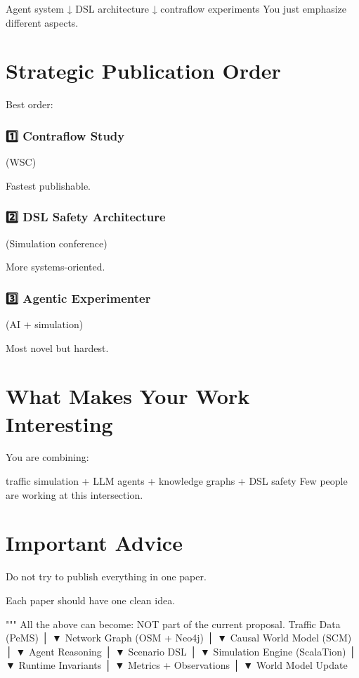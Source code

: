 Agent system
↓
DSL architecture
↓
contraflow experiments
You just emphasize different aspects.

\chapter*{Strategic Publication Order}
Best order:

\subsection*{1️⃣ Contraflow Study}
(WSC)

Fastest publishable.

\subsection*{2️⃣ DSL Safety Architecture}
(Simulation conference)

More systems-oriented.

\subsection*{3️⃣ Agentic Experimenter}
(AI + simulation)

Most novel but hardest.

\chapter*{What Makes Your Work Interesting}
You are combining:

traffic simulation
+
LLM agents
+
knowledge graphs
+
DSL safety
Few people are working at this intersection.

\chapter*{Important Advice}
Do not try to publish everything in one paper.

Each paper should have one clean idea.



"""
All the above can become: NOT part of the current proposal.
Traffic Data (PeMS)
│
▼
Network Graph (OSM + Neo4j)
│
▼
Causal World Model (SCM)
│
▼
Agent Reasoning
│
▼
Scenario DSL
│
▼
Simulation Engine (ScalaTion)
│
▼
Runtime Invariants
│
▼
Metrics + Observations
│
▼
World Model Update